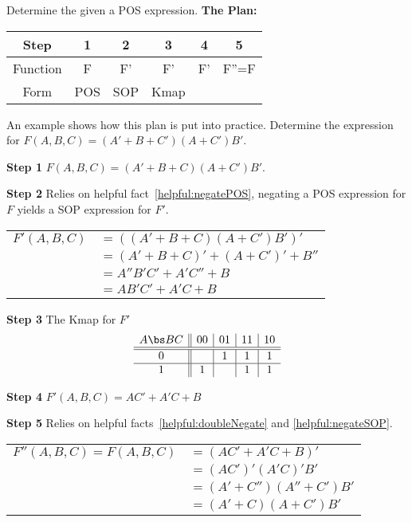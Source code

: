 \begin{process}{Determine the \POSmin given a POS expression.}
\label{process:minimizationPOSToPOS}
\textbf{The Plan:}

\begin{tabular}{|c|c|c|c|c|c|}\hline
Step	  & 1  & 2  & 3  & 4  & 5  \\ \hline
Function  & F  & F'  & F'  & F' &  F''=F \\ \hline
Form	  & POS & SOP & Kmap & \SOPmin & \POSmin \\ \hline
\end{tabular}
\vspace{0.2cm}

An example shows how this plan is put into practice.
Determine the \POSmin expression for $F(A,B,C) = (A'+B+C')(A+C')B'$.

\textbf{Step 1} $F(A,B,C) = (A'+B+C)(A+C')B'$.

\textbf{Step 2} Relies on helpful fact~\ref{helpful:negatePOS},
negating a POS expression for $F$ yields a SOP expression
for $F'$.

\begin{tabular}[ht]{ll}
$F'(A,B,C) $		&  $= ((A'+B+C)(A+C')B')'   $  \\
				&  $= (A'+B+C)' + (A+C')' + B''$ \\
				&  $= A''B'C' + A'C'' + B 	$ \\ 
				&  $= AB'C' + A'C + B $ \\
\end{tabular}

\textbf{Step 3} The Kmap for $F'$ 
$$ \begin{array} {c||c|c|c|c}
        A \bs BC & 00 & 01 & 11 & 10 \\ \hline \hline
        0             &      &  1  &  1  &  1  \\ \hline
        1             &  1  &      &  1   & 1    \\ 
\end{array} $$

\textbf{Step 4} $F'(A,B,C)= AC' + A'C + B$

\textbf{Step 5} Relies on helpful facts~\ref{helpful:doubleNegate}
and \ref{helpful:negateSOP}. 

\begin{tabular}[ht]{ll}
$F''(A,B,C) = F(A,B,C)$		& 	$= (AC' + A'C + B)'$			\\
				&	$= (AC')'(A'C)'B' 		$		\\
				&	$= (A' + C'')(A'' + C')B'$		\\
				&	$=(A' + C)(A + C')B' $			\\
\end{tabular}
\end{process}

